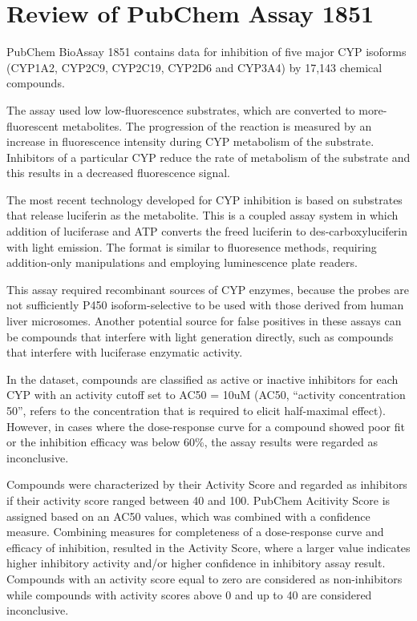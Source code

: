 \section{Review of PubChem Assay 1851}

PubChem BioAssay 1851 contains data for inhibition of five major CYP isoforms (CYP1A2, CYP2C9, CYP2C19, CYP2D6 and CYP3A4) by 17,143 chemical compounds. \cite{Veith2009}

The assay used low low-fluorescence substrates, which are converted to more-fluorescent metabolites. The progression of the reaction is measured by an increase in fluorescence intensity during CYP metabolism of the substrate. Inhibitors of a particular CYP reduce the rate of metabolism of the substrate and this results in a decreased fluorescence signal. \cite{Zlokarnik2005}

The most recent technology developed for CYP inhibition is based on substrates that release luciferin as the metabolite. This is a coupled assay system in which addition of luciferase and ATP converts the freed luciferin to des-carboxyluciferin with light emission. The format is similar to fluoresence methods, requiring addition-only manipulations and employing luminescence plate readers. \cite{Zlokarnik2005}

This assay required recombinant sources of CYP enzymes, because the probes are not sufficiently P450 isoform-selective to be used with those derived from human liver microsomes. Another potential source for false positives in these assays can be compounds that interfere with light generation directly, such as compounds that interfere with luciferase enzymatic activity. \cite{Zlokarnik2005}


In the dataset, compounds are classified as active or inactive inhibitors for each CYP with an activity cutoff set to AC50 = 10uM (AC50, “activity concentration 50”, refers to the concentration that is required to elicit half-maximal effect). However, in cases where the dose-response curve for a compound showed poor fit or the inhibition efficacy was below 60\%, the assay results were regarded as inconclusive.\cite{Lapins2013}

Compounds were characterized by their Activity Score and regarded as inhibitors if their activity score ranged between 40 and 100. PubChem Acitivity Score is assigned based on an AC50 values, which was combined with a confidence measure. Combining measures for completeness of a dose-response curve and efficacy of inhibition, resulted in the Activity Score, where a larger value indicates higher inhibitory activity and/or higher confidence in inhibitory assay result. Compounds with an activity score equal to zero are considered as non-inhibitors while compounds with activity scores above 0 and up to 40 are considered inconclusive. \cite{Lapins2013}


